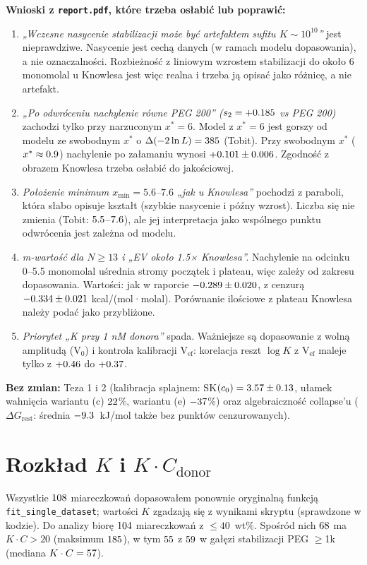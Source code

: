 \documentclass[10pt,a4paper]{article}
\begin{document}
\textbf{Wnioski z \texttt{report.pdf}, które trzeba osłabić lub poprawić:}
\begin{enumerate}\itemsep1pt
\item \emph{„Wczesne nasycenie stabilizacji może być artefaktem sufitu $K\sim10^{10}$”} jest nieprawdziwe. Nasycenie jest cechą danych (w ramach modelu dopasowania), a nie oznaczalności. Rozbieżność z liniowym wzrostem stabilizacji do około 6 monomolal u Knowlesa jest więc realna i trzeba ją opisać jako różnicę, a nie artefakt.
\item \emph{„Po odwróceniu nachylenie równe PEG 200” ($s_2=+0.185$ vs PEG 200)} zachodzi tylko przy narzuconym $x^*=6$. Model z $x^*=6$ jest gorszy od modelu ze swobodnym $x^*$ o $\Delta(-2\ln L)=385$ (Tobit). Przy swobodnym $x^*$ ($x^*\approx0.9$) nachylenie po załamaniu wynosi $+0.101\pm0.006$. Zgodność z obrazem Knowlesa trzeba osłabić do jakościowej.
\item \emph{Położenie minimum $x_\mathrm{min}=5.6$--$7.6$ „jak u Knowlesa”} pochodzi z paraboli, która słabo opisuje kształt (szybkie nasycenie i późny wzrost). Liczba się nie zmienia (Tobit: $5.5$--$7.6$), ale jej interpretacja jako wspólnego punktu odwrócenia jest zależna od modelu.
\item \emph{m-wartość dla $N\geq13$ i „EV około 1.5× Knowlesa”.} Nachylenie na odcinku 0--5.5 monomolal uśrednia stromy początek i plateau, więc zależy od zakresu dopasowania. Wartości: jak w raporcie $-0.289\pm0.020$, z cenzurą $-0.334\pm0.021$ kcal/(mol·molal). Porównanie ilościowe z plateau Knowlesa należy podać jako przybliżone.
\item \emph{Priorytet „K przy 1 nM donora”} spada. Ważniejsze są dopasowanie z wolną amplitudą (V$_0$) i kontrola kalibracji V$_\mathrm{ef}$: korelacja reszt $\log K$ z V$_\mathrm{ef}$ maleje tylko z $+0.46$ do $+0.37$.
\end{enumerate}
\textbf{Bez zmian:} Teza 1 i 2 (kalibracja splajnem: SK$(c_0)=3.57\pm0.13$, ułamek wahnięcia wariantu (c) $22$\%, wariantu (e) $-37$\%) oraz algebraiczność collapse'u ($\Delta G_\mathrm{rest}$: średnia $-9.3$~kJ/mol także bez punktów cenzurowanych).

\section{Rozkład $K$ i $K\cdot C_\mathrm{donor}$}
Wszystkie $108$ miareczkowań dopasowałem ponownie oryginalną funkcją \texttt{fit\_single\_dataset}; wartości $K$ zgadzają się z wynikami skryptu (sprawdzone w kodzie). Do analizy biorę $104$ miareczkowań z $\leq40$~wt\%. Spośród nich $68$ ma $K\cdot C>20$ (maksimum $185$), w tym $55$ z $59$ w gałęzi stabilizacji PEG $\geq$1k (mediana $K\cdot C=57$).
\end{document}
